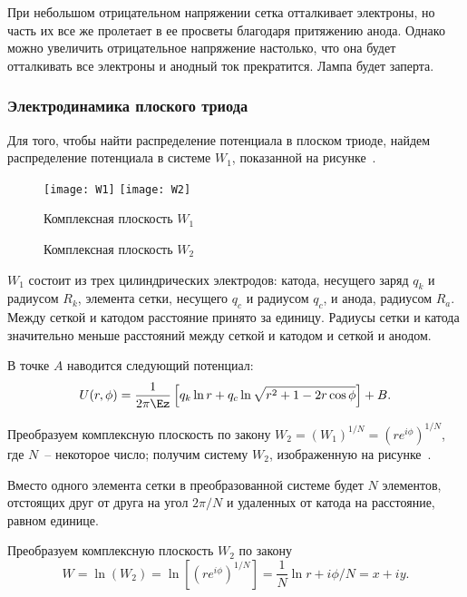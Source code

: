 При небольшом отрицательном напряжении сетка отталкивает электроны, но часть их
все же пролетает в ее просветы благодаря притяжению анода. Однако можно
увеличить отрицательное напряжение настолько, что она будет отталкивать все
электроны и анодный ток прекратится. Лампа будет заперта.

\subsubsection{Электродинамика плоского триода}

Для того, чтобы найти распределение потенциала в плоском триоде, найдем
распределение потенциала в системе \( W_1 \), показанной на рисунке~.

\begin{figure}[h!]
  \center
  \texttt{[image: W1]} \hspace{1em}
  \texttt{[image: W2]} \\
  \parbox{.4\textwidth}{\caption{Комплексная плоскость \( W_1 \)}
    \label{picW1}} \hspace{1em}
  \parbox{.4\textwidth}{\caption{Комплексная плоскость \( W_2 \)}
    \label{picW2}}
\end{figure}

\( W_1 \) состоит из трех цилиндрических электродов: катода, несущего заряд
\( q_k \) и радиусом \( R_k \), элемента сетки, несущего \( q_c \) и радиусом
\( q_c \), и анода, радиусом \( R_a \). Между сеткой и катодом расстояние
принято за единицу. Радиусы сетки и катода значительно меньше расстояний между
сеткой и катодом и сеткой и анодом.

В точке \( A \) наводится следующий потенциал:
\begin{equation}
  U(r, \phi) = \frac{1}{2\pi\Ez}\left[ q_k \ln r + q_c\ln\sqrt{r^2 + 1 -
    2r\cos\phi} \right] + B.
  \label{eqU1}
\end{equation}

Преобразуем комплексную плоскость по закону \( W_2 = (W_1)^{1 / N} =
(re^{i\phi})^{1 / N} \), где \( N \)~-- некоторое число; получим систему
\( W_2 \), изображенную на рисунке~.

Вместо одного элемента сетки в преобразованной системе будет \( N \) элементов,
отстоящих друг от друга на угол \( 2\pi / N \) и удаленных от катода на
расстояние, равном единице.

Преобразуем комплексную плоскость \( W_2 \) по закону
\[
  W = \ln(W_2) = \ln\left[ (re^{i\phi})^{1 / N} \right] = \frac{1}{N}\ln r +
    i\phi / N = x + iy.
\]

